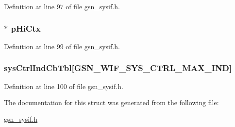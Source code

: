 Definition at line 97 of file gsn\_\-sysif.h.

\hypertarget{a00261_ab671e23204d79f8fda7dba9992c3d6e9}{
\subsubsection[{pHiCtx}]{$\ast$ {\bf pHiCtx}}}
\label{a00261_ab671e23204d79f8fda7dba9992c3d6e9}


Definition at line 99 of file gsn\_\-sysif.h.

\hypertarget{a00261_abcd1c853db90819acbb6f2a31aa53e8f}{
\subsubsection[{sysCtrlIndCbTbl}]{ {\bf sysCtrlIndCbTbl}\mbox{[}GSN\_\-WIF\_\-SYS\_\-CTRL\_\-MAX\_\-IND\mbox{]}}}
\label{a00261_abcd1c853db90819acbb6f2a31aa53e8f}


Definition at line 100 of file gsn\_\-sysif.h.



The documentation for this struct was generated from the following file:\begin{DoxyCompactItemize}
\item 
\hyperlink{a00596}{gsn\_\-sysif.h}\end{DoxyCompactItemize}
